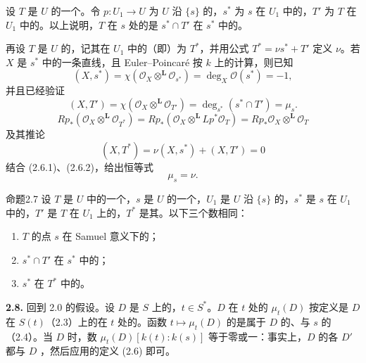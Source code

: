 设 $T$ 是 $U$ 的一个。令 $p:U_1\to U$ 为 $U$ 沿 $\{s\}$ 的，$s^*$ 为 $s$ 在 $U_1$ 中的，$T'$ 为 $T$ 在 $U_1$ 中的。以上说明，$T$ 在 $s$ 处的是 $s^*\cap T'$ 在 $s^*$ 中的。

再设 $T$ 是 $U$ 的，记其在 $U_1$ 中的（即）为 $T^*$，并用公式 $T^*=\nu s^*+T'$ 定义 $\nu$。若 $X$ 是 $s^*$ 中的一条直线，且 Euler--Poincaré 按 $k$ 上的计算，则已知
\[
(X,s^*)=\chi(\mathcal O_X\mathbin{\otimes^{\mathbf L}}\mathcal O_{s^*})=\deg_X\mathcal O(s^*)=-1,\tag{2.6.1}
\]
并且已经验证
\[
(X,T')=\chi(\mathcal O_X\mathbin{\otimes^{\mathbf L}}\mathcal O_{T'})=\deg_{s^*}(s^*\cap T')=\mu_s.\tag{2.6.2}
\]
\[
Rp_*(\mathcal O_X\mathbin{\otimes^{\mathbf L}}\mathcal O_{T^*})
=Rp_*(\mathcal O_X\mathbin{\otimes^{\mathbf L}}Lp^*\mathcal O_T)
=Rp_*\mathcal O_X\mathbin{\otimes^{\mathbf L}}\mathcal O_T
\]
及其推论
\[
(X,T^*)=\nu(X,s^*)+(X,T')=0
\]
结合 (2.6.1)、(2.6.2)，给出恒等式
\[
\mu_s=\nu.\tag{2.6.3}
\]
\begin{SGAresult}{命题}{2.7}
设 $T$ 是 $U$ 中的一个，$s$ 是 $U$ 的一个，$U_1$ 是 $U$ 沿 $\{s\}$ 的，$s^*$ 是 $s$ 在 $U_1$ 中的，$T'$ 是 $T$ 在 $U_1$ 上的，$T^*$ 是其。以下三个数相同：
\begin{enumerate}
\item[(i)] $T$ 的点 $s$ 在 Samuel 意义下的；
\item[(ii)] $s^*\cap T'$ 在 $s^*$ 中的；
\item[(iii)] $s^*$ 在 $T^*$ 中的。
\end{enumerate}
\end{SGAresult}
\textbf{2.8.} 回到 2.0 的假设。设 $D$ 是 $S$ 上的，$t\in S^*$。$D$ 在 $t$ 处的 $\mu_t(D)$ 按定义是 $D$ 在 $S(t)$（2.3）上的在 $t$ 处的。函数 $t\mapsto\mu_t(D)$ 的是属于 $D$ 的、与 $s$ 的（2.4）。当 $D$ 时，数 $\mu_t(D)[k(t):k(s)]$ 等于零或一：事实上，$D$ 的各 $D'$ 都与 $D$ ，然后应用的定义 (2.6) 即可。

